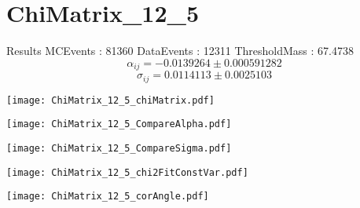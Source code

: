 \documentclass[a4paper,12pt]{article}
\begin{document}
\section{ChiMatrix\_12\_5}
\begin{minipage}{0.49\linewidth} Results \newline
MCEvents : 81360\newline
DataEvents : 12311 \newline
ThresholdMass : 67.4738\\
$$\alpha_{ij} = -0.0139264\pm 0.000591282$$
$$\sigma_{ij} = 0.0114113\pm 0.0025103$$
\end{minipage}\hfill
\begin{minipage}{0.49\linewidth} 
\texttt{[image: ChiMatrix\_12\_5\_chiMatrix.pdf]}\\
\end{minipage}
\hfill
\begin{minipage}{0.49\linewidth} 
\texttt{[image: ChiMatrix\_12\_5\_CompareAlpha.pdf]}\\
\end{minipage}
\hfill
\begin{minipage}{0.49\linewidth} 
\texttt{[image: ChiMatrix\_12\_5\_CompareSigma.pdf]}\\
\end{minipage}
\begin{minipage}{0.49\linewidth} 
\texttt{[image: ChiMatrix\_12\_5\_chi2FitConstVar.pdf]}\\
\end{minipage}
\hfill
\begin{minipage}{0.49\linewidth} 
\texttt{[image: ChiMatrix\_12\_5\_corAngle.pdf]}\\
\end{minipage}
\end{document}
